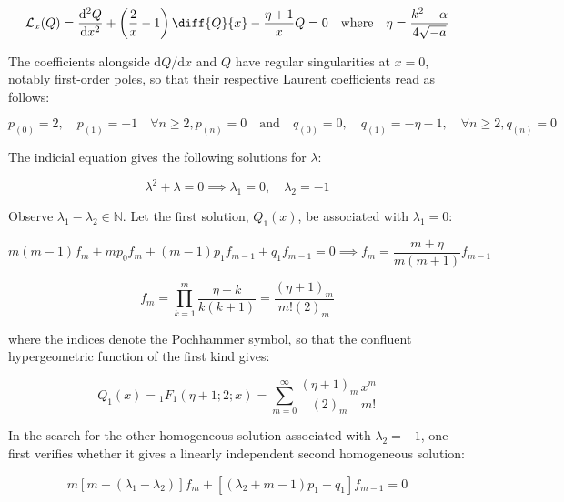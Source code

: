 \begin{equation}
    \label{eq-6-94}
    \mathcal{L}_x(Q)=\frac{\mathrm{d}^2Q}{\mathrm{d}x^2}+\left(\frac{2}{x}-1\right)\diff{Q}{x}-\frac{\eta+1}{x}Q=0\quad\text{where}\quad\eta=\frac{k^2-\alpha}{4\sqrt{-a}}
\end{equation}

The coefficients alongside $\mathrm{d}Q/\mathrm{d}x$ and $Q$ have regular singularities at $x=0$, notably first-order poles, so that their respective Laurent coefficients read as follows:

\begin{equation}
    \label{eq-6-96}
    p_{(0)}=2,\quad p_{(1)}=-1\quad\forall n\geq2, p_{(n)}=0\quad\text{and}\quad q_{(0)}=0,\quad q_{(1)}=-\eta-1,\quad\forall n\geq2,q_{(n)}=0
\end{equation}

The indicial equation gives the following solutions for $\lambda$:

\begin{equation}
    \lambda^2+\lambda=0\implies\lambda_1=0,\quad\lambda_2=-1
\end{equation}

Observe $\lambda_1-\lambda_2\in\mathbb{N}$. Let the first solution, $Q_1(x)$, be associated with $\lambda_1=0$:

\begin{equation}
    m(m-1)f_{m}+mp_{0}f_{m}+(m-1)p_{1}f_{m-1}+q_{1}f_{m-1}=0\implies f_{m}=\frac{m+\eta}{m(m+1)}f_{m-1}
\end{equation}

\begin{equation}
    f_{m}=\prod_{k=1}^m\frac{\eta+k}{k(k+1)}=\frac{(\eta+1)_m}{m!(2)_m}
\end{equation}

where the indices denote the Pochhammer symbol, so that the confluent hypergeometric function of the first kind gives:

\begin{equation}
    Q_1(x)={_1F_1}(\eta+1;2;x)=\sum_{m=0}^\infty\frac{(\eta+1)_m}{(2)_m}\frac{x^m}{m!}
\end{equation}

In the search for the other homogeneous solution associated with $\lambda_2=-1$, one first verifies whether it gives a linearly independent second homogeneous solution:

\begin{equation}
    m\left[m-(\lambda_1-\lambda_2)\right]f_m+\left[(\lambda_2+m-1)p_1+q_1\right]f_{m-1}=0
\end{equation}

